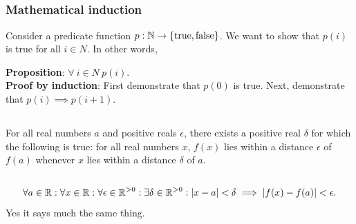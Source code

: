 \documentclass[12pt]{article}
\begin{document}
\subsection{}
\begin{mdframed}
\subsubsection*{Mathematical induction}
Consider a predicate function $p: \mathbb{N} \to \{\text{true},\text{false}\}$. We want to show
that $p(i)$ is true for all $i \in N$. In other words,

\textbf{Proposition}: $\forall ~ i \in N ~ p(i)$.\\

\textbf{Proof by induction}: First demonstrate that $p(0)$ is true. Next,
demonstrate that $p(i) \implies p(i+1)$.

\end{mdframed}

\subsection{}
\begin{mdframed}
  For all real numbers $a$ and positive reals $\epsilon$, there exists a
  positive real $\delta$ for which the following is true: for all real numbers
  $x$, $f(x)$ lies within a distance $\epsilon$ of $f(a)$ whenever $x$ lies
  within a distance $\delta$ of $a$.
\end{mdframed}

\subsection{}
\begin{mdframed}
  \begin{align*}
    \forall a \in \mathbb{R}: \forall x \in \mathbb{R}: \forall \epsilon \in \mathbb{R}^{>0}: \exists \delta \in \mathbb{R}^{>0}: |x - a| < \delta \implies |f(x) - f(a)| < \epsilon.
  \end{align*}
Yes it says much the same thing.
\end{mdframed}

\subsection{}

\newpage
\end{document}
